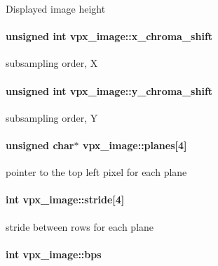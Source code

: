 Displayed image height \hypertarget{structvpx__image_affaf210489dcefebd90b87fd5f12dc0b}{
\paragraph[{x\+\_\+chroma\+\_\+shift}]{\setlength{\rightskip}{0pt plus 5cm}unsigned int vpx\+\_\+image\+::x\+\_\+chroma\+\_\+shift}}\label{structvpx__image_affaf210489dcefebd90b87fd5f12dc0b}
subsampling order, X \hypertarget{structvpx__image_a1e3d9b699d46ca32e3916d1ac635a4a2}{
\paragraph[{y\+\_\+chroma\+\_\+shift}]{\setlength{\rightskip}{0pt plus 5cm}unsigned int vpx\+\_\+image\+::y\+\_\+chroma\+\_\+shift}}\label{structvpx__image_a1e3d9b699d46ca32e3916d1ac635a4a2}
subsampling order, Y \hypertarget{structvpx__image_ab6258308ba7a5f4a113348120e20e2ce}{
\paragraph[{planes}]{\setlength{\rightskip}{0pt plus 5cm}unsigned char$\ast$ vpx\+\_\+image\+::planes\mbox{[}4\mbox{]}}}\label{structvpx__image_ab6258308ba7a5f4a113348120e20e2ce}
pointer to the top left pixel for each plane \hypertarget{structvpx__image_ac9c7b83e3eea44cb680956f90dc789cf}{
\paragraph[{stride}]{\setlength{\rightskip}{0pt plus 5cm}int vpx\+\_\+image\+::stride\mbox{[}4\mbox{]}}}\label{structvpx__image_ac9c7b83e3eea44cb680956f90dc789cf}
stride between rows for each plane \hypertarget{structvpx__image_a53a02fad822151eb8eeb2f64f195e1f6}{
\paragraph[{bps}]{\setlength{\rightskip}{0pt plus 5cm}int vpx\+\_\+image\+::bps}}\label{structvpx__image_a53a02fad822151eb8eeb2f64f195e1f6}
